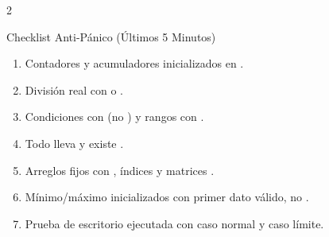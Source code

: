 \documentclass[10pt,letterpaper]{article}
\begin{document}
\begin{multicols}{2}
\vspace{-4pt}
\begin{ejercicio}{Checklist Anti-Pánico (Últimos 5 Minutos)}
\scriptsize
\begin{enumerate}[leftmargin=11pt,itemsep=1pt]
  \item Contadores y acumuladores inicializados en .
  \item División real con  o .
  \item Condiciones con \codigo{==} (no \codigo{=}) y rangos con \codigo{\&\&}.
  \item Todo  lleva  y existe .
  \item Arreglos fijos con , índices  y matrices \codigo{[][MAX\_C]}.
  \item Mínimo/máximo inicializados con primer dato válido, no .
  \item Prueba de escritorio ejecutada con caso normal y caso límite.
\end{enumerate}
\end{ejercicio}
\end{multicols}
\end{document}
